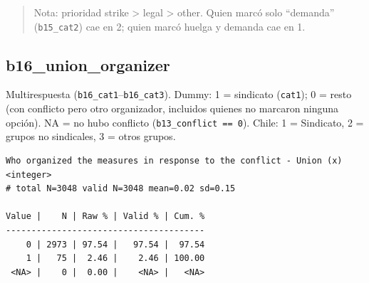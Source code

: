 \documentclass[
  letterpaper,
  DIV=11,
  numbers=noendperiod]{scrreprt}
\newenvironment{Shaded}{\begin{snugshade}}{\end{snugshade}}
\newcommand{\FunctionTok}[1]{\textcolor[rgb]{0.28,0.35,0.67}{#1}}
\newcommand{\NormalTok}[1]{\textcolor[rgb]{0.00,0.23,0.31}{#1}}
\newcommand{\SpecialCharTok}[1]{\textcolor[rgb]{0.37,0.37,0.37}{#1}}
\begin{document}
\begin{quote}
Nota: prioridad strike \textgreater{} legal \textgreater{} other. Quien
marcó solo ``demanda'' (\texttt{b15\_cat2}) cae en 2; quien marcó huelga
y demanda cae en 1.
\end{quote}

\subsection{b16\_union\_organizer}\label{b16_union_organizer}

Multirespuesta (\texttt{b16\_cat1}--\texttt{b16\_cat3}). Dummy: 1 =
sindicato (\texttt{cat1}); 0 = resto (con conflicto pero otro
organizador, incluidos quienes no marcaron ninguna opción). NA = no hubo
conflicto (\texttt{b13\_conflict\ ==\ 0}). Chile: 1 = Sindicato, 2 =
grupos no sindicales, 3 = otros grupos.

\begin{Shaded}
\end{Shaded}

\begin{verbatim}
Who organized the measures in response to the conflict - Union (x) <integer> 
# total N=3048 valid N=3048 mean=0.02 sd=0.15

Value |    N | Raw % | Valid % | Cum. %
---------------------------------------
    0 | 2973 | 97.54 |   97.54 |  97.54
    1 |   75 |  2.46 |    2.46 | 100.00
 <NA> |    0 |  0.00 |    <NA> |   <NA>
\end{verbatim}
\end{document}
